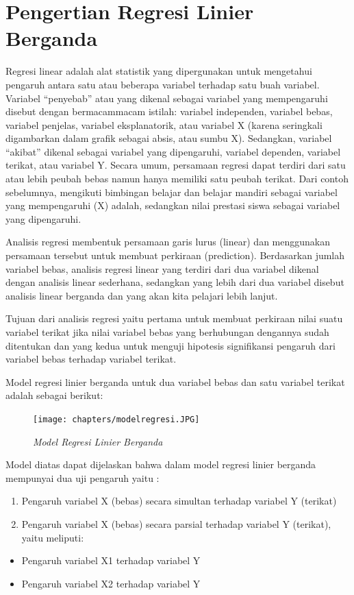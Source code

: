 \section{Pengertian Regresi Linier Berganda}
\par Regresi linear adalah alat statistik yang dipergunakan untuk mengetahui pengaruh antara satu atau beberapa variabel terhadap satu buah variabel. Variabel “penyebab” atau yang dikenal sebagai variabel yang mempengaruhi disebut dengan bermacammacam istilah: variabel independen, variabel bebas, variabel penjelas, variabel eksplanatorik, atau variabel X (karena seringkali digambarkan dalam grafik sebagai absis, atau sumbu X). Sedangkan, variabel “akibat” dikenal sebagai variabel yang dipengaruhi, variabel dependen, variabel terikat, atau variabel Y. Secara umum, persamaan regresi dapat terdiri dari satu atau lebih peubah bebas namun hanya memiliki satu peubah terikat. Dari contoh sebelumnya, mengikuti bimbingan belajar dan belajar mandiri sebagai variabel yang mempengaruhi (X) adalah, sedangkan nilai prestasi siswa sebagai variabel yang dipengaruhi.  
\par Analisis regresi membentuk persamaan garis lurus (linear) dan menggunakan persamaan tersebut untuk membuat perkiraan (prediction). Berdasarkan jumlah variabel bebas, analisis regresi linear yang terdiri dari dua variabel dikenal dengan analisis linear sederhana, sedangkan yang lebih dari dua variabel disebut analisis linear berganda dan yang akan kita pelajari lebih lanjut.  
\par Tujuan dari analisis regresi yaitu pertama untuk membuat perkiraan nilai suatu variabel terikat jika nilai variabel bebas yang berhubungan dengannya sudah ditentukan dan yang kedua untuk menguji hipotesis signifikansi pengaruh dari variabel bebas terhadap variabel terikat.  
\par Model regresi linier berganda untuk dua variabel bebas dan satu variabel terikat adalah sebagai berikut: 
\begin{figure}[hb]
\centering
\texttt{[image: chapters/modelregresi.JPG]}
\caption{\textit{Model Regresi Linier Berganda}
\label{eq:31}}
\end{figure} 
\par Model diatas dapat dijelaskan bahwa dalam model regresi linier berganda mempunyai dua uji pengaruh yaitu :  
\begin{enumerate}
\item 	Pengaruh variabel X (bebas) secara simultan terhadap variabel Y (terikat)  
\item 	Pengaruh variabel X (bebas) secara parsial terhadap variabel Y (terikat), yaitu meliputi:  
\end{enumerate}
    \begin{itemize}
               \item Pengaruh variabel X1 terhadap variabel Y  
               \item Pengaruh variabel X2 terhadap variabel Y 
               \end{itemize}
